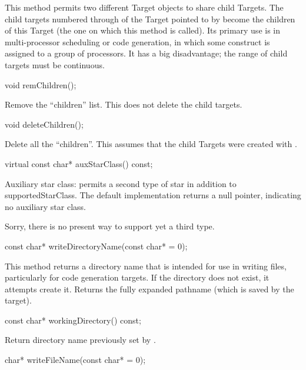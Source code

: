 This method permits two different Target objects to share child Targets.
The child targets numbered  through  of the Target
pointed to by  become the children of this Target (the one
on which this method is called).  Its primary use is in multi-processor
scheduling or code generation, in which some construct is assigned to
a group of processors.  It has a big disadvantage; the range of child
targets must be continuous.

\begin{example}
void remChildren();
\end{example}

Remove the ``children'' list.  This does not delete the child targets.

\begin{example}
void deleteChildren();
\end{example}

Delete all the ``children''.  This assumes that the child Targets
were created with .

\begin{example}
virtual const char* auxStarClass() const;
\end{example}

Auxiliary star class: permits a second type of star in addition
to supportedStarClass.  The default implementation returns a
null pointer, indicating no auxiliary star class.

Sorry, there is no present way to support yet a third type.

\begin{example}
const char* writeDirectoryName(const char*  = 0);
\end{example}

This method returns a directory name that is intended for
use in writing files, particularly for code generation targets.
If the directory does not exist, it attempts create it.
Returns the fully expanded pathname (which is saved by
the target).

\begin{example}
const char* workingDirectory() const;
\end{example}

Return directory name previously set by .

\begin{example}
char* writeFileName(const char*  = 0);
\end{example}

